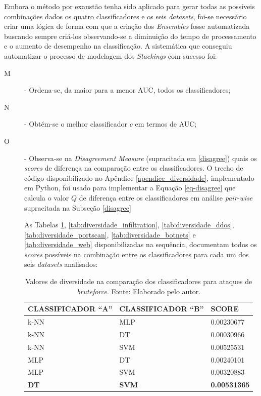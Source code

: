 Embora o método por exaustão tenha sido aplicado para gerar todas as possíveis combinações dados os quatro classificadores e os seis \textit{datasets}, foi-se necessário criar uma lógica de forma com que a criação dos \textit{Ensembles} fosse automatizada buscando sempre criá-los observando-se a diminuição do tempo de processamento e o aumento de desempenho na classificação. A sistemática que conseguiu automatizar o processo de modelagem dos \textit{Stackings} com sucesso foi:

\begin{description}
  \item[M] - Ordena-se, da maior para a menor AUC, todos os classificadores;
  \item[N] - Obtém-se o melhor classificador $c$ em termos de AUC;
  \item[O] - Observa-se na \textit{Disagreement Measure} (supracitada em \ref{disagree}) quais os \textit{scores} de diferença na comparação entre os classificadores.   O trecho de código disponibilizado no Apêndice \ref{apendice_diversidade}, implementado em Python, foi usado para implementar a Equação \ref{eq-disagree} que calcula o valor $Q$ de diferença entre os classificadores em análise \textit{pair-wise} supracitada na Subseção \ref{disagree}
  
  As Tabelas \ref{tab:diversidade_bruteforce}, \ref{tab:diversidade_infiltration}, \ref{tab:diversidade_ddos}, \ref{tab:diversidade_portscan}, \ref{tab:diversidade_botnets} e \ref{tab:diversidade_web} disponibilizadas na sequência, documentam todos os \textit{scores} possíveis na combinação entre os classificadores para cada um dos seis \textit{datasets} analisados:






\begin{longtable}{l|l|l}
\caption{Valores de diversidade na comparação dos classificadores para ataques de \textit{bruteforce}. Fonte: Elaborado pelo autor.}

\label{tab:diversidade_bruteforce}

\hline


\textbf{CLASSIFICADOR ``A''} & \textbf{CLASSIFICADOR ``B''} 		& \textbf{SCORE}         \\ \hline \hline

k-NN & MLP & 0.00230677 \\ \hline
k-NN & DT  & 0.00030966 \\ \hline
k-NN & SVM & 0.00525531 \\ \hline
MLP  & DT  & 0.00240101 \\ \hline
MLP  & SVM & 0.00320883 \\ \hline
\textbf{DT}   & \textbf{SVM} & \textbf{0.00531365} \\ \hline



\end{longtable}
\end{description}

